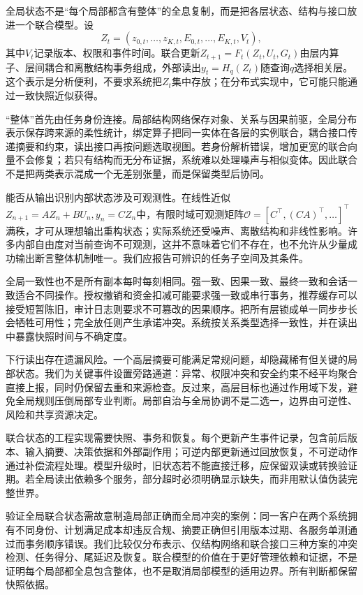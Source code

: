 全局状态不是“每个局部都含有整体”的全息复制，而是把各层状态、结构与接口放进一个联合模型。设
\begin{equation}
 Z_t=(z_{0,t},\ldots,z_{K,t},E_{0,t},\ldots,E_{K,t},V_t),
\end{equation}
其中$V_t$记录版本、权限和事件时间。联合更新$Z_{t+1}=F_t(Z_t,U_t,G_t)$由层内算子、层间耦合和离散结构事务组成，外部读出$y_t=H_q(Z_t)$随查询$q$选择相关层。这个表示是分析便利，不要求系统把$Z_t$集中存放；在分布式实现中，它可能只能通过一致快照近似获得。

“整体”首先由任务身份连接。局部结构网络保存对象、关系与因果前驱，全局分布表示保存跨来源的柔性统计，绑定算子把同一实体在各层的实例联合，耦合接口传递摘要和约束，读出接口再按问题选取视图。若身份解析错误，增加更宽的联合向量不会修复；若只有结构而无分布证据，系统难以处理噪声与相似变体。因此联合不是把两类表示混成一个无差别张量，而是保留类型后协同。

能否从输出识别内部状态涉及可观测性。在线性近似$Z_{n+1}=AZ_n+BU_n, y_n=CZ_n$中，有限时域可观测矩阵$\mathcal O=[C^\top,(CA)^\top,\ldots]^{\top}$满秩，才可从理想输出重构状态；实际系统还受噪声、离散结构和非线性影响。许多内部自由度对当前查询不可观测，这并不意味着它们不存在，也不允许从少量成功输出断言整体机制唯一。我们应报告可辨识的任务子空间及其条件。

全局一致性也不是所有副本每时每刻相同。强一致、因果一致、最终一致和会话一致适合不同操作。授权撤销和资金扣减可能要求强一致或串行事务，推荐缓存可以接受短暂陈旧，审计日志则要求不可篡改的因果顺序。把所有层锁成单一同步步长会牺牲可用性；完全放任则产生承诺冲突。系统按关系类型选择一致性，并在读出中暴露快照时间与不确定度。

下行读出存在遗漏风险。一个高层摘要可能满足常规问题，却隐藏稀有但关键的局部状态。我们为关键事件设置旁路通道：异常、权限冲突和安全约束不经平均聚合直接上报，同时仍保留去重和来源检查。反过来，高层目标也通过作用域下发，避免全局规则压倒局部专业判断。局部自治与全局协调不是二选一，边界由可逆性、风险和共享资源决定。

联合状态的工程实现需要快照、事务和恢复。每个更新产生事件记录，包含前后版本、输入摘要、决策依据和外部副作用；可逆内部更新通过回放恢复，不可逆动作通过补偿流程处理。模型升级时，旧状态若不能直接迁移，应保留双读或转换验证期。若全局读出依赖多个服务，部分超时必须明确显示缺失，而非用默认值伪装完整世界。

验证全局联合状态需故意制造局部正确而全局冲突的案例：同一客户在两个系统拥有不同身份、计划满足成本却违反合规、摘要正确但引用版本过期、各服务单测通过而事务顺序错误。我们比较仅分布表示、仅结构网络和联合接口三种方案的冲突检测、任务得分、尾延迟及恢复。联合模型的价值在于更好管理依赖和证据，不是证明每个局部都全息包含整体，也不是取消局部模型的适用边界。所有判断都保留快照依据。

